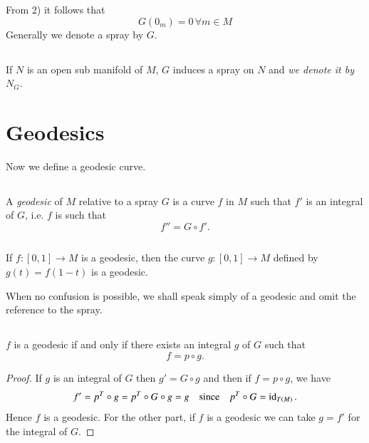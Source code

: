 \begin{note*}
From 2) it follows that
$$
G(0_{m})=0\,\forall m\in M
$$
Generally we denote a spray by $G$.
\end{note*}

\setcounter{subsection}{2}
\subsection{}\label{chap1:1.1.3}
If $N$ is an open sub manifold of $M$, $G$ induces a spray on $N$ and
{\em we denote it by} $N_{G}$.

\section{Geodesics}\label{chap1:sec2}

Now we define a geodesic curve.


\subsection{}\label{chap1:1.2.1}

\begin{defi*}
A {\em geodesic} of $M$ relative to a spray $G$ is a curve $f$ in $M$
such that $f'$ is an integral of $G$, i.e. $f$ is such that
$$
f''=G\circ f'.
$$
\end{defi*}

\subsection{}\label{chap1:1.2.2}

\begin{remark*}
If $f:[0,1]\to M$ is a geodesic, then the curve $g:[0,1]\to M$ defined
by $g(t)=f(1-t)$ is a geodesic.
\end{remark*}

When no confusion is possible, we shall speak simply of a geodesic and
omit the reference to the spray.

\subsection{}\label{chap1:1.2.3}

\begin{prop*}
$f$ is a geodesic if and only if there exists an integral $g$ of $G$
  such that
$$
f=p\circ g.
$$
\end{prop*}

\begin{proof}
If \pageoriginale $g$ is an integral of $G$ then $g'=G\circ g$ and then
if $f=p\circ g$, we have
$$
f'=p^{T}\circ g=p^{T}\circ G\circ g=g\quad\text{since}\quad p^{T}\circ
G=\operatorname{id}_{T(M)}. 
$$
Hence $f$ is a geodesic. For the other part, if $f$ is a geodesic we
can take $g=f'$ for the integral of $G$.
\end{proof}

